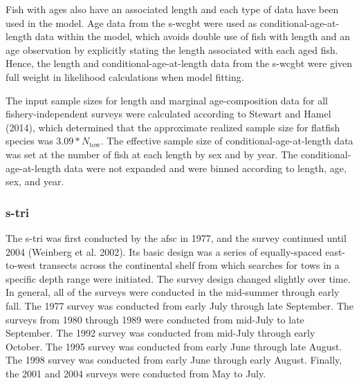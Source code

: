 \documentclass[11pt,
  english,
  a4paper,
]{article}
\begin{document}

Fish with ages also have an associated length and each type of data have been used in the model. Age data from the \gls{s-wcgbt} were used as conditional-age-at-length data within the model, which avoids double use of fish with length and an age observation by explicitly stating the length associated with each aged fish. Hence, the length and conditional-age-at-length data from the \gls{s-wcgbt} were given full weight in likelihood calculations when model fitting.

\leavevmode\tagmcend\tagstructend\par


The input sample sizes for length and marginal age-composition data for all fishery-independent surveys were calculated according to Stewart and Hamel {(2014)\leavevmode\tagmcend\tagstructend}, which determined that the approximate realized sample size for flatfish species was {\(3.09*N_{\text{tow}}\)\leavevmode\tagmcend\tagstructend}. The effective sample size of conditional-age-at-length data was set at the number of fish at each length by sex and by year. The conditional-age-at-length data were not expanded and were binned according to length, age, sex, and year.

\leavevmode\tagmcend\tagstructend\par


\hypertarget{section}{%
\subsubsection{\texorpdfstring{\acrlong{s-tri}}{}}\label{section}}

\leavevmode\tagmcend\tagstructend


The \gls{s-tri} was first conducted by the \gls{afsc} in 1977, and the survey continued until 2004 {(Weinberg et al. 2002)\leavevmode\tagmcend\tagstructend}. Its basic design was a series of equally-spaced east-to-west transects across the continental shelf from which searches for tows in a specific depth range were initiated. The survey design changed slightly over time. In general, all of the surveys were conducted in the mid-summer through early fall. The 1977 survey was conducted from early July through late September. The surveys from 1980 through 1989 were conducted from mid-July to late September. The 1992 survey was conducted from mid-July through early October. The 1995 survey was conducted from early June through late August. The 1998 survey was conducted from early June through early August. Finally, the 2001 and 2004 surveys were conducted from May to July.
\end{document}
